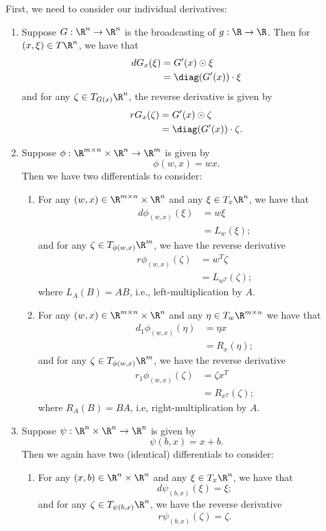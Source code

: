 First, we need to consider our individual derivatives:
\begin{enumerate}
	\item Suppose $G:\R^n\to\R^n$ is the broadcasting of $g:\R\to\R$.  Then for $(x,\xi)\in T\R^n$, we have that
	\begin{align*}
		dG_x(\xi)&=G'(x)\odot\xi\\
		&=\diag(G'(x))\cdot\xi
	\end{align*}
	and for any $\zeta\in T_{G(x)}\R^n$, the reverse derivative is given by
	\begin{align*}
		rG_x(\zeta)&=G'(x)\odot\zeta\\
		&=\diag(G'(x))\cdot\zeta.
	\end{align*}
	
	\item Suppose $\phi:\R^{m\times n}\times\R^n\to\R^m$ is given by $$\phi(w,x)=wx.$$
	Then we have two differentials to consider:
	\begin{enumerate}
		\item For any $(w,x)\in\R^{m\times n}\times\R^n$ and any $\xi\in T_x\R^n$, we have that
		\begin{align*}
			d\phi_{(w,x)}(\xi)&=w\xi\\
			&=L_w(\xi);
		\end{align*}
		and for any $\zeta\in T_{\phi(w,x)}\R^m$, we have the reverse derivative
		\begin{align*}
			r\phi_{(w,x)}(\zeta)&=w^T\zeta\\
			&=L_{w^T}(\zeta);
		\end{align*}
		where $L_A(B)=AB$, i.e., left-multiplication by $A$.
		
		\item For any $(w,x)\in\R^{m\times n}\times\R^n$ and any $\eta\in T_w\R^{m\times n}$ we have that
		\begin{align*}
			d_1\phi_{(w,x)}(\eta)&=\eta x\\
			&=R_x(\eta);
		\end{align*}
		and for any $\zeta\in T_{\phi(w,x)}\R^m$, we have the reverse derivative
		\begin{align*}
		r_1\phi_{(w,x)}(\zeta)&=\zeta x^T\\
		&=R_{x^T}(\zeta);	
		\end{align*}
		where $R_A(B)=BA$, i.e, right-multiplication by $A$.

	\end{enumerate}
	
	\item Suppose $\psi:\R^n\times\R^n\to\R^n$ is given by
	$$\psi(b,x)=x+b.$$
	Then we again have two (identical) differentials to consider:
	\begin{enumerate}
		\item For any $(x,b)\in\R^n\times\R^n$ and any $\xi\in T_x\R^n$, we have that
		$$d\psi_{(b,x)}(\xi)=\xi;$$
		and for any $\zeta\in T_{\psi(b,x)}\R^n$, we have the reverse derivative
		$$r\psi_{(b,x)}(\zeta)=\zeta.$$
		

\end{enumerate}
\end{enumerate}
